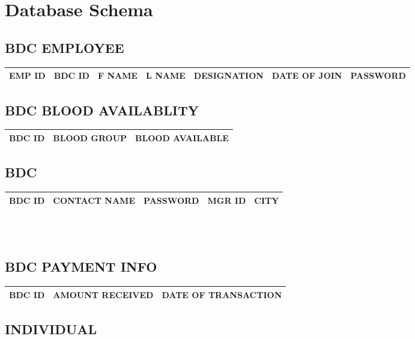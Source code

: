 \begin{sloppypar}
\section{Database Schema}

\subsection{BDC EMPLOYEE}

\begin{tabular}{ | c | c | c | c | c | c | c | }
 \hline
 EMP ID & BDC ID & F NAME & L NAME & DESIGNATION & DATE OF JOIN & PASSWORD \\
 \hline
\end{tabular}

\subsection{BDC BLOOD AVAILABLITY}

\begin{tabular}{ | c | c | c | }
 \hline
 BDC ID & BLOOD GROUP & BLOOD AVAILABLE \\
 \hline
\end{tabular}

\subsection{BDC}

\begin{tabular}{ | c | c | c | c | c | }
 \hline
 BDC ID & CONTACT NAME & PASSWORD & MGR ID & CITY \\
 \hline
\end{tabular} \\ \\

\subsection{BDC PAYMENT INFO}

\begin{tabular}{ | c | c | c | }
 \hline
 BDC ID & AMOUNT RECEIVED & DATE OF TRANSACTION \\
 \hline
\end{tabular}

\subsection{INDIVIDUAL}


\end{sloppypar}

